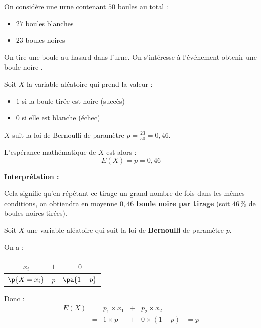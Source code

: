 \begin{ex}
	On considère une urne contenant $50$ boules au total :

	\begin{itemize}
		\item $27$ boules blanches
		\item $23$ boules noires
	\end{itemize}

	On tire une boule au hasard dans l'urne. On s'intéresse à l'événement \og obtenir une boule noire \fg{}.

	Soit $X$ la variable aléatoire qui prend la valeur :

	\begin{itemize}
		\item $1$ si la boule tirée est noire (succès)
		\item $0$ si elle est blanche (échec)
	\end{itemize}

	$X$ suit la loi de Bernoulli de paramètre $p = \frac{23}{50} = 0{,}46$.

	L'espérance mathématique de $X$ est alors :
	\[
		E(X) = p = 0{,}46
	\]

	\textbf{Interprétation :}

	Cela signifie qu'en répétant ce tirage un grand nombre de fois dans les mêmes conditions, on obtiendra en moyenne \textbf{$0{,}46$ boule noire par tirage} (soit $46\,\%$ de boules noires tirées).
\end{ex}

\begin{demo}
	Soit $X$ une variable aléatoire qui suit la loi de \textbf{Bernoulli} de paramètre $p$.

	On a :

	\begin{center}
		\begin{tabular}{|c|c|c|} \hline
			\ccg $x_i$       & $1$ & $0$        \\ \hline
			\ccg $\p{X=x_i}$ & $p$ & $\pa{1-p}$ \\ \hline
		\end{tabular}
	\end{center}

	Donc :
	\[
		\begin{array}{rccccl}
			E(X) & = & p_1\times x_1 & + & p_2\times x_2   &     \\
			     & = & 1\times p     & + & 0\times (1 - p) & = p
		\end{array}
	\]
\end{demo}

